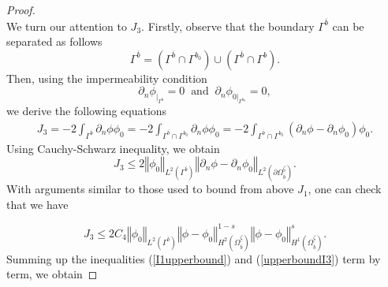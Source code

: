 \documentclass[11pt]{article}
\begin{document}
\begin{proof}
\begin{equation}
	\end{equation}
	We turn our attention to $J_3$. Firstly, observe that the boundary  $\Gamma^{\overline{b}}$ can be separated as follows
	$$\Gamma^{\overline{b}}=(\Gamma^{\overline{b}}\cap\Gamma^{b_0})\cup(\Gamma^{\overline{b}}\cap\Gamma^{b}).$$
	Then, using the impermeability condition 
	$$\partial_n\phi_{|_{\Gamma^{b}}}=0\;\;\text{and}\;\; \partial_n\phi_{0|_{\Gamma^{b_0}}}=0,$$
	we derive the following equations
	\begin{equation*}
		\begin{split}
			J_3= -2\displaystyle\int_{\Gamma^{\overline{b}}} \partial_n\phi \phi_0=-2\displaystyle\int_{\Gamma^{\overline{b}}\cap\Gamma^{b_0}} \partial_n\phi \phi_0=-2\displaystyle\int_{\Gamma^{\overline{b}}\cap\Gamma^{b_0}} \left(\partial_n\phi-\partial_n\phi_0\right) \phi_0.
		\end{split}
	\end{equation*}
	Using Cauchy-Schwarz inequality, we obtain 
	$$J_3\leq 2\left\Vert  \phi_0\right\Vert_{L^{2}(\Gamma^{\overline{b}} )} \left\Vert  \partial_n\phi-\partial_n\phi_0\right\Vert_{L^{2}(\partial\Omega_{\overline{b}}^{\underline{\zeta}} )}.$$
	With arguments similar to those used to bound from above $J_1$, one can check that we have %
	
	\begin{equation}\label{upperboundI3}
		J_3\leq 2C_4\left\Vert  \phi_0\right\Vert_{L^{2}(\Gamma^{\overline{b}} )} \left\Vert \phi-\phi_0 \right\Vert^{1-s}_{H^{2}(\Omega_{\overline{b}}^{\underline{\zeta}} )}\left\Vert \phi-\phi_0 \right\Vert^s_{H^{1}(\Omega_{\overline{b}}^{\underline{\zeta}} )}.
	\end{equation}
	Summing up the inequalities (\ref{I1upperbound}) and (\ref{upperboundI3}) term by term, we obtain
	

\end{proof}
\end{document}
